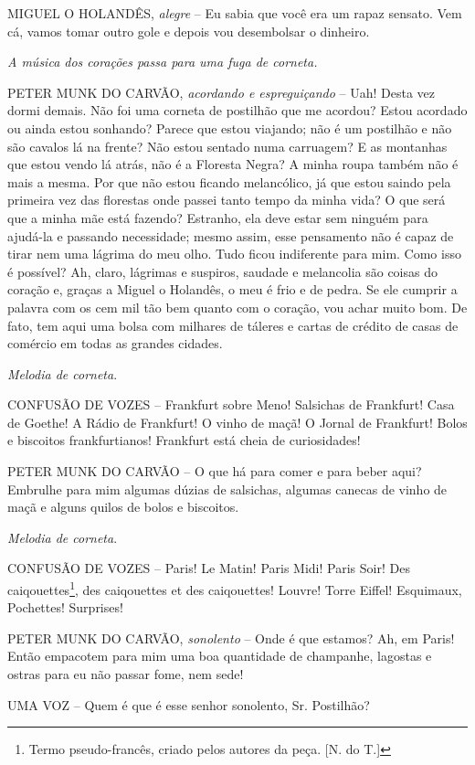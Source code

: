 MIGUEL O HOLANDÊS, \emph{alegre} -- Eu sabia que você era um rapaz
sensato. Vem cá, vamos tomar outro gole e depois vou desembolsar o
dinheiro.

\emph{A música dos corações passa para uma fuga de corneta.}

PETER MUNK DO CARVÃO, \emph{acordando e espreguiçando} -- Uah! Desta vez
dormi demais. Não foi uma corneta de postilhão que me acordou? Estou
acordado ou ainda estou sonhando? Parece que estou viajando; não é um
postilhão e não são cavalos lá na frente? Não estou sentado numa
carruagem? E as montanhas que estou vendo lá atrás, não é a Floresta
Negra? A minha roupa também não é mais a mesma. Por que não estou
ficando melancólico, já que estou saindo pela primeira vez das florestas
onde passei tanto tempo da minha vida? O que será que a minha mãe está
fazendo? Estranho, ela deve estar sem ninguém para ajudá-la e passando
necessidade; mesmo assim, esse pensamento não é capaz de tirar nem uma
lágrima do meu olho. Tudo ficou indiferente para mim. Como isso é
possível? Ah, claro, lágrimas e suspiros, saudade e melancolia são
coisas do coração e, graças a Miguel o Holandês, o meu é frio e de
pedra. Se ele cumprir a palavra com os cem mil tão bem quanto com o
coração, vou achar muito bom. De fato, tem aqui uma bolsa com milhares
de táleres e cartas de crédito de casas de comércio em todas as grandes
cidades.

\emph{Melodia de corneta}.

CONFUSÃO DE VOZES -- Frankfurt sobre Meno! Salsichas de Frankfurt! Casa
de Goethe! A Rádio de Frankfurt! O vinho de maçã! O Jornal de Frankfurt!
Bolos e biscoitos frankfurtianos! Frankfurt está cheia de curiosidades!

PETER MUNK DO CARVÃO -- O que há para comer e para beber aqui? Embrulhe
para mim algumas dúzias de salsichas, algumas canecas de vinho de maçã e
alguns quilos de bolos e biscoitos.

\emph{Melodia de corneta}.

CONFUSÃO DE VOZES -- Paris! Le Matin! Paris Midi! Paris Soir! Des
caiqouettes\footnote{Termo pseudo-francês, criado pelos autores da peça.
  {[}N. do T.{]}}, des caiqouettes et des caiqouettes! Louvre! Torre
Eiffel! Esquimaux, Pochettes! Surprises!

PETER MUNK DO CARVÃO, \emph{sonolento} -- Onde é que estamos? Ah, em
Paris! Então empacotem para mim uma boa quantidade de champanhe,
lagostas e ostras para eu não passar fome, nem sede!

UMA VOZ -- Quem é que é esse senhor sonolento, Sr. Postilhão?


